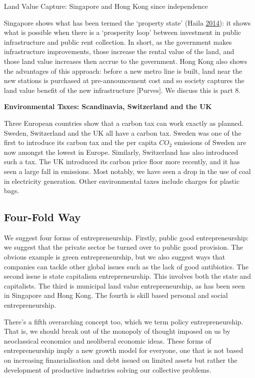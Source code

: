 \documentclass[]{tufte-handout}
\begin{document}
Land Value Capture: Singapore and Hong Kong since independence

Singapore shows what has been termed the `property state' (Haila
\protect\hyperlink{ref-Haila2015}{2014}): it shows what is possible when
there is a `prosperity loop' between investment in public infrastructure
and public rent collection. In short, as the government makes
infrastructure improvements, those increase the rental value of the
land, and those land value increases then accrue to the government. Hong
Kong also shows the advantages of this approach: before a new metro line
is built, land near the new stations is purchased at pre-announcement
cost and so society captures the land value benefit of the new
infrastructure {[}Purves{]}. We discuss this is part 8.

\textbf{Environmental Taxes: Scandinavia, Switzerland and the UK }

Three European countries show that a carbon tax can work exactly as
planned. Sweden, Switzerland and the UK all have a carbon tax. Sweden
was one of the first to introduce its carbon tax and the per capita
\(CO_2\) emissions of Sweden are now amongst the lowest in Europe.
Similarly, Switzerland has also introduced such a tax. The UK introduced
its carbon price floor more recently, and it has seen a large fall in
emissions. Most notably, we have seen a drop in the use of coal in
electricity generation. Other environmental taxes include charges for
plastic bags.

\hypertarget{four-fold-way}{%
\subsection{\texorpdfstring{\textbf{Four-Fold
Way}}{Four-Fold Way}}\label{four-fold-way}}

We suggest four forms of entrepreneurship. Firstly, public good
entrepreneurship: we suggest that the private sector be turned over to
public good provision. The obvious example is green entrepreneurship,
but we also suggest ways that companies can tackle other global issues
such as the lack of good antibiotics. The second issue is state
capitalism entrepreneurship. This involves both the state and
capitalists. The third is municipal land value entrepreneurship, as has
been seen in Singapore and Hong Kong. The fourth is skill based personal
and social entrepreneurship.

There's a fifth overarching concept too, which we term policy
entrepreneurship. That is, we should break out of the monopoly of
thought imposed on us by neoclassical economics and neoliberal economic
ideas. These forms of entrepreneurship imply a new growth model for
everyone, one that is not based on increasing financialisation and debt
issued on limited assets but rather the development of productive
industries solving our collective problems.
\end{document}
